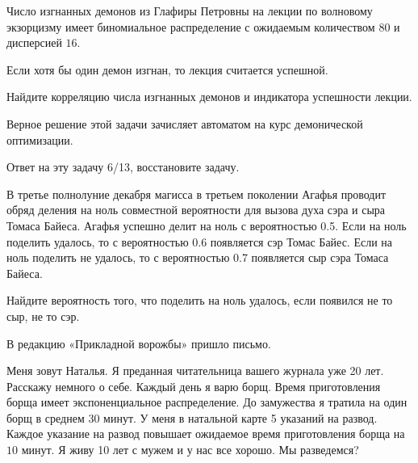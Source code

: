 \documentclass[12pt]{article}
\begin{document}
\begin{enumerate}[resume]
    Число изгнанных демонов из Глафиры Петровны на лекции по волновому экзорцизму имеет 
    биномиальное распределение с ожидаемым количеством $80$ и дисперсией $16$. 
    
    Если хотя бы один демон изгнан, то лекция считается успешной. 
    
    Найдите корреляцию числа изгнанных демонов и индикатора успешности лекции. 
    
    Верное решение этой задачи зачисляет автоматом на курс демонической оптимизации. 
    
    
\end{enumerate}

\newpage

Ответ на эту задачу 6/13, восстановите задачу.

\vspace*{1cm}

\begin{huge}
В третье полнолуние декабря магисса в третьем поколении Агафья проводит обряд деления на ноль совместной 
вероятности для вызова духа сэра и сыра Томаса Байеса. Агафья успешно делит на ноль с вероятностью 0.5.
Если на ноль поделить удалось, то с вероятностью 0.6 появляется сэр Томас Байес. 
Если на ноль поделить не удалось, то с вероятностью 0.7 появляется сыр сэра Томаса Байеса. 

Найдите вероятность того, что поделить на ноль удалось, если появился не то сыр, не то сэр. 



\end{huge}
\vspace*{2cm}

    В редакцию «Прикладной ворожбы» пришло письмо. 

\vspace*{1cm}
 
    Меня зовут Наталья. Я преданная читательница вашего журнала уже 20 лет. 
    Расскажу немного о себе. Каждый день я варю борщ. Время приготовления борща имеет экспоненциальное распределение. До замужества я тратила на один борщ в среднем 30 минут.
    У меня в натальной карте 5 указаний на развод. 
    Каждое указание на развод повышает ожидаемое время приготовления борща на $10$ минут. 
    Я живу 10 лет с мужем и у нас все хорошо. Мы разведемся?
\end{document}
